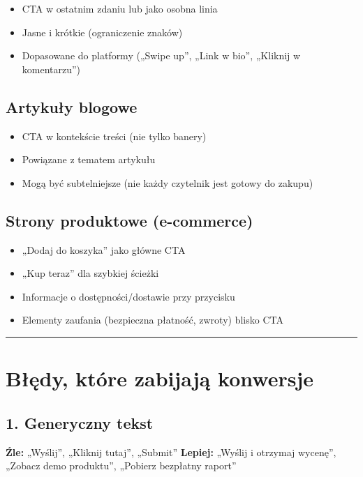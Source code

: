 \documentclass[
  12pt,
  a4paper,
  twoside,
  openright,
  12pt,
  DIV=12,
  BCOR=12mm]{scrbook}
\providecommand{\tightlist}{%
  \setlength{\itemsep}{0pt}\setlength{\parskip}{0pt}}\usepackage{longtable,booktabs,array}
\newcommand{\decoline}{%
  \begin{center}
    \textcolor{bordergray}{\rule{0.3\textwidth}{0.5pt}}
  \end{center}
}
\begin{document}
\begin{itemize}
\tightlist
\item
  CTA w ostatnim zdaniu lub jako osobna linia
\item
  Jasne i krótkie (ograniczenie znaków)
\item
  Dopasowane do platformy („Swipe up'', „Link w bio'', „Kliknij w
  komentarzu'')
\end{itemize}

\subsection{Artykuły blogowe}\label{artykuux142y-blogowe}

\begin{itemize}
\tightlist
\item
  CTA w kontekście treści (nie tylko banery)
\item
  Powiązane z tematem artykułu
\item
  Mogą być subtelniejsze (nie każdy czytelnik jest gotowy do zakupu)
\end{itemize}

\subsection{Strony produktowe
(e-commerce)}\label{strony-produktowe-e-commerce}

\begin{itemize}
\tightlist
\item
  „Dodaj do koszyka'' jako główne CTA
\item
  „Kup teraz'' dla szybkiej ścieżki
\item
  Informacje o dostępności/dostawie przy przycisku
\item
  Elementy zaufania (bezpieczna płatność, zwroty) blisko CTA
\end{itemize}

\decoline

\section{Błędy, które zabijają
konwersje}\label{bux142ux119dy-ktuxf3re-zabijajux105-konwersje}

\subsection{1. Generyczny tekst}\label{generyczny-tekst}

\textbf{Źle:} „Wyślij'', „Kliknij tutaj'', „Submit'' \textbf{Lepiej:}
„Wyślij i otrzymaj wycenę'', „Zobacz demo produktu'', „Pobierz bezpłatny
raport''
\end{document}
